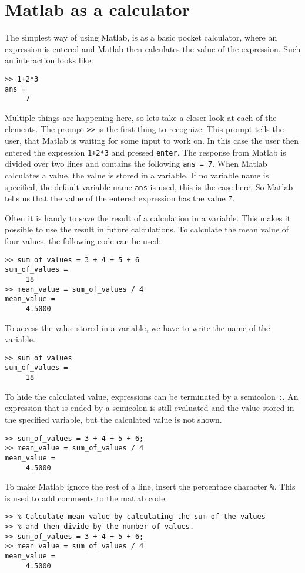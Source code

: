 \section{Matlab as a calculator}

The simplest way of using Matlab, is as a basic pocket calculator, where an
expression is entered and Matlab then calculates the value of the expression.
Such an interaction looks like:
\begin{lstlisting}
>> 1+2*3
ans =
     7
\end{lstlisting}
Multiple things are happening here, so lets take a closer look at each of the
elements.
The prompt \verb!>>! is the first thing to recognize.
This prompt tells the user, that Matlab is waiting for some input to work on.
In this case the user then entered the expression \verb!1+2*3! and pressed 
\verb!enter!.
The response from Matlab is divided over two lines and contains the following 
\verb!ans = 7!.
When Matlab calculates a value, the value is stored in a variable.
If no variable name is specified, the default variable name \verb!ans! is used, 
this is the case here.
So Matlab tells us that the value of the entered expression has the value 7.

Often it is handy to save the result of a calculation in a variable.
This makes it possible to use the result in future calculations.
To calculate the mean value of four values, the following code can be used:
\begin{lstlisting}
>> sum_of_values = 3 + 4 + 5 + 6
sum_of_values = 
     18
>> mean_value = sum_of_values / 4
mean_value =
     4.5000
\end{lstlisting}
To access the value stored in a variable, we have to write the name of the variable.
\begin{lstlisting}
>> sum_of_values
sum_of_values = 
     18
\end{lstlisting}
To hide the calculated value, expressions can be terminated by a semicolon \verb!;!.
An expression that is ended by a semicolon is still evaluated and the value stored in the
specified variable, but the calculated value is not shown.
\begin{lstlisting}
>> sum_of_values = 3 + 4 + 5 + 6;
>> mean_value = sum_of_values / 4
mean_value =
     4.5000
\end{lstlisting}

To make Matlab ignore the rest of a line, insert the percentage 
character \verb!%!. 
This is used to add comments to the matlab code.
\begin{lstlisting}
>> % Calculate mean value by calculating the sum of the values 
>> % and then divide by the number of values.
>> sum_of_values = 3 + 4 + 5 + 6;
>> mean_value = sum_of_values / 4
mean_value =
     4.5000
\end{lstlisting}


